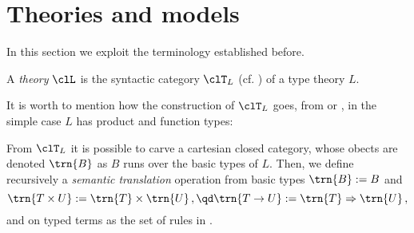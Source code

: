 \section{Theories and models}
\label{sec:orge02f333}
In this section we exploit the terminology established before.
\begin{definition}[Theory]\label{teoria}
	A \emph{theory} $\clL$ is the syntactic category $\clT_L$ (cf. \cite{lambek1988introduction}) of a type theory $L$.
\end{definition}
It is worth to mention how the construction of $\clT_L$ goes, from \cite{lambek1988introduction} or \cite{abramskyno}, in the simple case $L$ has product and function types:

From $\clT_L$ it is possible to carve a cartesian closed category, whose obects are denoted $\trn{B}$ as $B$ runs over the basic types of $L$. Then, we define recursively a \emph{semantic translation} operation from basic types $\trn{B} := B$ and
\[\trn{T\times U}:=\trn{T}\times\trn{U} \,,\qd \trn{T\to U}:=\trn{T}\Rightarrow\trn{U}\,, \]
and on typed terms as the set of rules in \cite[1.6.5]{abramskyno}.

